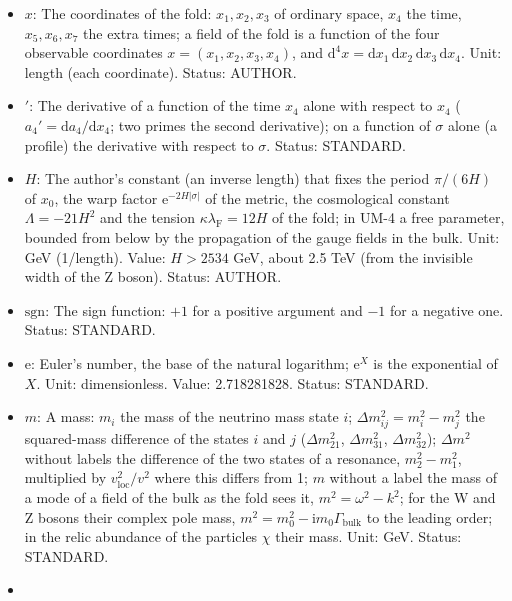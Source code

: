 \documentclass[
  10pt,
]{article}
\begin{document}
\begin{itemize}
  strength. Unit: GeV (field), GeV\(^2\) (field strength). Status:
  STANDARD.
\item
  \(x\): The coordinates of the fold: \(x_1, x_2, x_3\) of ordinary
  space, \(x_4\) the time, \(x_5, x_6, x_7\) the extra times; a field of
  the fold is a function of the four observable coordinates
  \(x = (x_1, x_2, x_3, x_4)\), and
  \(\mathrm{d}^4x = \mathrm{d}x_1\,\mathrm{d}x_2\,\mathrm{d}x_3\,\mathrm{d}x_4\).
  Unit: length (each coordinate). Status: AUTHOR.
\item
  \({}'\): The derivative of a function of the time \(x_4\) alone with
  respect to \(x_4\) (\(a_4' = \mathrm{d}a_4/\mathrm{d}x_4\); two primes
  the second derivative); on a function of \(\sigma\) alone (a profile)
  the derivative with respect to \(\sigma\). Status: STANDARD.
\item
  \(H\): The author's constant (an inverse length) that fixes the period
  \(\pi/(6H)\) of \(x_0\), the warp factor
  \(\mathrm{e}^{-2H\lvert\sigma\rvert}\) of the metric, the cosmological
  constant \(\Lambda = -21H^2\) and the tension
  \(\kappa\lambda_{\mathrm{F}} = 12H\) of the fold; in UM-4 a free
  parameter, bounded from below by the propagation of the gauge fields
  in the bulk. Unit: GeV (1/length). Value: \(H > 2534\) GeV, about 2.5
  TeV (from the invisible width of the Z boson). Status: AUTHOR.
\item
  \(\mathrm{sgn}\): The sign function: \(+1\) for a positive argument
  and \(-1\) for a negative one. Status: STANDARD.
\item
  \(\mathrm{e}\): Euler's number, the base of the natural logarithm;
  \(\mathrm{e}^{X}\) is the exponential of \(X\). Unit: dimensionless.
  Value: 2.718281828. Status: STANDARD.
\item
  \(m\): A mass: \(m_i\) the mass of the neutrino mass state \(i\);
  \(\Delta m_{ij}^2 = m_i^2 - m_j^2\) the squared-mass difference of the
  states \(i\) and \(j\) (\(\Delta m_{21}^2\), \(\Delta m_{31}^2\),
  \(\Delta m_{32}^2\)); \(\Delta m^2\) without labels the difference of
  the two states of a resonance, \(m_2^2 - m_1^2\), multiplied by
  \(v_{\mathrm{loc}}^2/v^2\) where this differs from 1; \(m\) without a
  label the mass of a mode of a field of the bulk as the fold sees it,
  \(m^2 = \omega^2 - k^2\); for the W and Z bosons their complex pole
  mass, \(m^2 = m_0^2 - \mathrm{i}m_0\Gamma_{\mathrm{bulk}}\) to the
  leading order; in the relic abundance of the particles \(\chi\) their
  mass. Unit: GeV. Status: STANDARD.
\item

\end{itemize}
\end{document}
